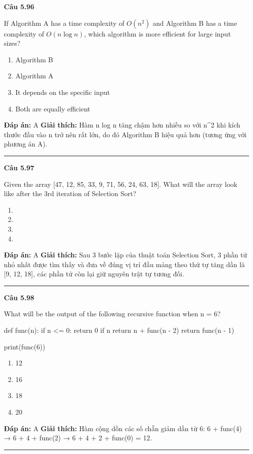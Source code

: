 \documentclass[11pt,a4paper]{article}
\newenvironment{question}[1]{%
  \par\vspace{1em}\noindent\textbf{\large Câu #1}\par\vspace{0.4em}
}{%
  \par\vspace{1em}\hrule\vspace{0.6em}
}
\newenvironment{choices}{%
  \begin{enumerate}[label=\textbf{\Alph*.},leftmargin=2.2em,itemsep=2pt,topsep=3pt]
}{%
  \end{enumerate}
}
\newcommand{\choice}{\item}
\newenvironment{codebox}{%
  \begin{tcolorbox}[colback=gray!8!white,colframe=gray!50!black,arc=1.5mm,boxrule=0.6pt,left=3mm,right=3mm,top=2.5mm,bottom=2.5mm]
  \ttfamily\small
}{%
  \end{tcolorbox}
}
\begin{document}
\begin{question}{5.96}
If Algorithm A has a time complexity of $O(n^2)$ and Algorithm B has a time complexity of $O(n \log n)$, which algorithm is more efficient for large input sizes?
\begin{choices}
\choice Algorithm B
\choice Algorithm A
\choice It depends on the specific input
\choice Both are equally efficient
\end{choices}
\textbf{Đáp án:} A
\textbf{Giải thích:} Hàm n log n tăng chậm hơn nhiều so với n^2 khi kích thước đầu vào n trở nên rất lớn, do đó Algorithm B hiệu quả hơn (tương ứng với phương án A).
\end{question}

\begin{question}{5.97}
Given the array [47, 12, 85, 33, 9, 71, 56, 24, 63, 18]. What will the array look like after the 3rd iteration of Selection Sort?
\begin{choices}
\choice [9, 12, 18, 33, 47, 71, 56, 24, 63, 85]
\choice [9, 12, 18, 47, 33, 71, 56, 24, 63, 85]
\choice [9, 12, 33, 18, 47, 71, 56, 24, 63, 85]
\choice [9, 12, 18, 33, 85, 71, 56, 24, 63, 47]
\end{choices}
\textbf{Đáp án:} A
\textbf{Giải thích:} Sau 3 bước lặp của thuật toán Selection Sort, 3 phần tử nhỏ nhất được tìm thấy và đưa về đúng vị trí đầu mảng theo thứ tự tăng dần là [9, 12, 18], các phần tử còn lại giữ nguyên trật tự tương đối.
\end{question}

\begin{question}{5.98}
What will be the output of the following recursive function when n = 6?
\begin{codebox}
def func(n):
    if n <= 0:
        return 0
    if n %
        return n + func(n - 2)
    return func(n - 1)

print(func(6))
\end{codebox}
\begin{choices}
\choice 12
\choice 16
\choice 18
\choice 20
\end{choices}
\textbf{Đáp án:} A
\textbf{Giải thích:} Hàm cộng dồn các số chẵn giảm dần từ 6: 6 + func(4) → 6 + 4 + func(2) → 6 + 4 + 2 + func(0) = 12.
\end{question}
\end{document}
